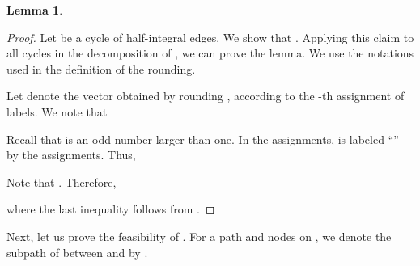 \documentclass{article}
\newtheorem{lemma}{Lemma}
\begin{document}
\begin{lemma}\label{lem.cost-terminal}

\end{lemma}
\begin{proof}
 Let  be a cycle of half-integral edges.
 We show that .
 Applying this claim to all cycles in the decomposition of , we
 can prove the lemma.
 We use the notations used in the definition of the rounding.
 
 Let  denote the vector obtained by rounding , 
according to the -th assignment of labels.
We note that 
 

Recall that  is an odd number larger than one.
In the  assignments,  is 
labeled ``'' by the  assignments.
Thus, 

Note that . Therefore,

where the last inequality follows from .
\end{proof}

Next, let us prove the feasibility of .
For a path  and nodes  on , we denote the subpath of  between
 and  by .
\end{document}
